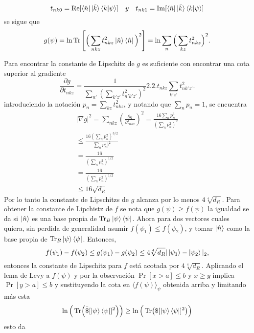 \begin{equation}
t_{nk0}= \Re [ \bra{\hat{n}} \tilde{\ket{k}} \bra{k}\ket{\psi}] \quad y \quad  t_{nk1}= \Im [ \bra{\hat{n}} \tilde{\ket{k}} \bra{k}\ket{\psi}]
\end{equation}
se sigue que 
\begin{equation}
g(\psi)= \ln \Tr \Bigg[  \Big( \sum_{nkz} t_{nkz}^{2}  \ket{\hat{n}} \bra{\hat{n}}  \Big)^{2} \Bigg]= \ln \sum_{n} \Big( \sum_{kz} t_{nkz}^{2} \Big)^{2}.
\end{equation}

Para encontrar la constante de Lipschitz de $g$ es suficiente con encontrar una cota superior al gradiente 
\begin{equation}
\frac{\partial g}{\partial t_{nkz}}=\frac{1}{\sum_{n'} (\sum_{k'z'}t_{n'k'z'}^{2})^{2}} 2.2.t_{nkz} \sum_{k'z'}t_{nk'z'}^{2}.
\end{equation}
introduciendo la notación $p_{n}=\sum_{kz}t_{nkz}^{2}$, y notando que $\sum_{n} p_{n}=1$, se encuentra 
\begin{multline}
|\nabla g|^{2}= \sum_{nkz} (\frac{\partial g}{\partial t_{nkz}})^{2}= \frac{16 \sum_{n} p_{n}^{3}}{(\sum_{n} p_{n}^{2})^{2}}\\
\leq \frac{16(\sum_{n} p_{n}^{2})^{3/2}}{\sum_{n} p_{n}^{2})^{2}}\\
=\frac{16}{(\sum_{n} p_{n}^{2})^{1/2}}\\
=\frac{16}{(\sum_{n} p_{n}^{2})^{1/2}}\\
\leq 16 \sqrt{d_{R}}
\end{multline}
Por lo tanto la constante de Lipschitzs de $g$ alcanza por lo menos $4 \sqrt[4]{d_{R}}$. Para obtener la constante de Lipchistz de $f$ se nota que $g(\psi) \geq f(\psi)$ la igualdad se da si $ { \ket{ \hat{n}} }$ es una base  propia de $\Tr_{B} \ket{\psi}\bra{\psi}$. Ahora para dos vectores cuales quiera, sin perdida de generalidad asumir $f(\psi_{1}) \leq f(\psi_{2})$, y tomar ${ \ket{\hat{n}} }$ como la base propia de $\Tr_{B} \ket{\psi}\bra{\psi}$. Entonces,
\begin{equation}
f(\psi_{1})- f(\psi_{2})\leq g(\psi_{1})- g(\psi_{2}) \leq 4\sqrt[4]{d_{R}} |\ket{\psi_{1}}-\ket{\psi_{2}}|_{2},
\end{equation}
entonces la constante de Lipschitz para $f$ está acotada por $4\sqrt[4]{d_{R}}$.
Aplicando el lema de Levy a $f(\psi)$ y  por la observación $\Pr[x>a] \leq b$ y $x \geq y$ implica $\Pr[y>a] \leq b$ y sustituyendo la cota en $\langle f(\psi) \rangle_{\psi}$ obtenida arriba y limitando más esta 
\begin{equation}
\ln\Big( \Tr (\tilde{\$}[\ket{\psi}\bra{\psi}]^{2}) \Big) \geq \ln\Big( \Tr ( \$ [\ket{\psi}\bra{\psi}]^{2}) \Big)
\end{equation}
esto da 

